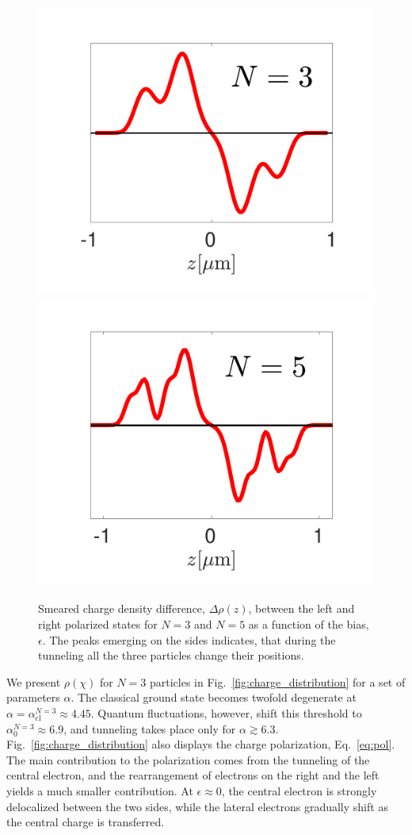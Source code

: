 \documentclass[aps, prb, floatfix, twocolumn, notitlepage, superscriptaddress, 10pt]{revtex4-2}
\newcommand{\1}{{1\hspace*{-0.5ex} \textrm{l} \hspace*{0.5ex}}}
\begin{document}
\begin{figure}[t!]
\begin{center}
\includegraphics[width=0.49\columnwidth]{Fig_WaveFunction_difference_3_part.pdf}
\includegraphics[width=0.49\columnwidth]{Fig_WaveFunction_difference_N_5.pdf}
 \caption{
 \label{fig:charge_conrast}
Smeared  charge density difference, $\Delta \rho(z)$, between the left and right polarized states 
 for $N=3$ and $N=5$ as a function of the bias, $\epsilon$. The peaks emerging on the sides indicates, that during the tunneling all the three particles change their positions. }
\end{center}
\end{figure}

 
 We present  $\rho(\chi)$  for $N=3$ particles in Fig.~\ref{fig:charge_distribution}
for a set of parameters $\alpha$. The classical ground state  becomes twofold degenerate at  
$\alpha=\alpha^{N=3}_\text{cl}\approx 4.45$. Quantum fluctuations, however, shift this threshold
to $\alpha^{N=3}_\text{0}\approx 6.9$, and tunneling takes place only for  $\alpha \gtrsim  6.3$. 
Fig.~\ref{fig:charge_distribution} also displays the charge polarization, Eq.~\eqref{eq:pol}. 
The main contribution to  the polarization comes from the tunneling of the central electron, 
and the rearrangement of  electrons on the right and the left yields a much smaller contribution. 
At $\epsilon\approx 0$, the central electron is strongly delocalized between the two sides, while the 
lateral electrons gradually shift as the central charge is transferred. 
\end{document}
